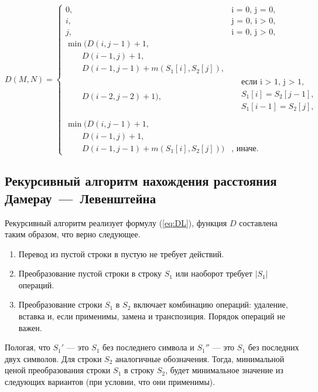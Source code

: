 \begin{equation}
	\label{eq:DL}
	D(M, N) = 
	\begin{cases}
		0, &\text{i = 0, j = 0,}\\
		i, &\text{j = 0, i > 0,}\\
		j, &\text{i = 0, j > 0,}\\
		 \min (  D(i, j - 1) + 1,\\
			\qquad D(i - 1, j) + 1,\\
			\qquad D(i - 1, j - 1) + m(S_{1}[i], S_{2}[j]), \\
			\qquad D(i - 2, j - 2) + 1 ),
		& \begin{aligned}
			& \text{если i > 1, j > 1}, \\
			& S_{1}[i] = S_{2}[j - 1], \\
			& S_{1}[i - 1] = S_{2}[j], \\
		\end{aligned}\\
		
			\min ( D(i, j - 1) + 1,\\
			\qquad  D(i - 1, j) + 1, \\
			\qquad  D(i - 1, j - 1) + m(S_{1}[i], S_{2}[j]) ) & \text{, иначе.}
	\end{cases}
\end{equation}

\subsection{Рекурсивный алгоритм нахождения расстояния Дамерау~---~Левенштейна}

Рекурсивный алгоритм реализует формулу (\ref{eq:DL}), функция $D$ составлена таким образом, что верно следующее.
\begin{enumerate}
	\item Перевод из пустой строки в пустую не требует действий.
	\item Преобразование пустой строки в строку $S_{1}$ или наоборот требует $|S_{1}|$ операций.
	\item Преобразование строки $S_{1}$ в $S_{2}$ включает комбинацию операций: удаление, вставка и, если применимы, замена и транспозиция. Порядок операций не важен.	
\end{enumerate}

Пологая, что $S_{1}'$  --- это $S_{1}$ без последнего символа и $S_{1}''$  --- это $S_{1}$ без последних двух символов. 
Для строки $S_{2}$ аналогичные обозначения.
Тогда, минимальной ценой преобразования строки $S_{1}$ в строку $S_{2}$, будет минимальное значение из следующих вариантов (при условии, что они применимы).

